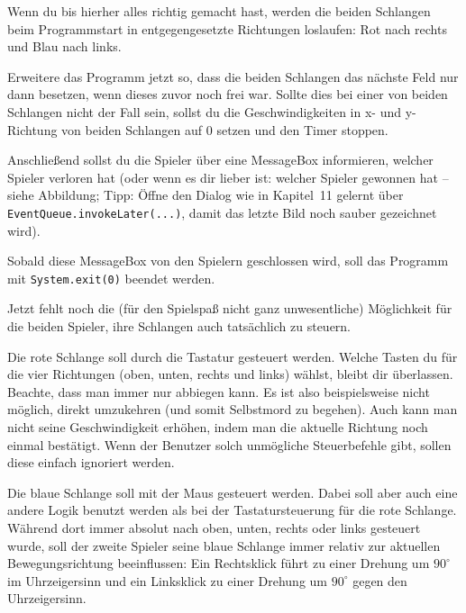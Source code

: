 \begin{compactenum}[a)]
\item Wenn du bis hierher alles richtig gemacht hast, werden die beiden
Schlangen beim Programmstart in entgegengesetzte Richtungen loslaufen: Rot
nach rechts und Blau nach links.

Erweitere das Programm jetzt so, dass die beiden Schlangen das nächste Feld nur
dann besetzen, wenn dieses zuvor noch frei war. Sollte dies bei einer von
beiden Schlangen nicht der Fall sein, sollst du die Geschwindigkeiten in x- und
y-Richtung von beiden Schlangen auf $0$ setzen und den Timer stoppen.

Anschließend sollst du die Spieler über eine MessageBox informieren, welcher
Spieler verloren hat (oder wenn es dir lieber ist: welcher Spieler gewonnen
hat -- siehe Abbildung; Tipp: Öffne den Dialog wie in Kapitel~11 gelernt über
\lstinline|EventQueue.invokeLater(...)|, damit das letzte Bild noch sauber
gezeichnet wird).

Sobald diese MessageBox von den Spielern geschlossen wird, soll das Programm
mit \lstinline|System.exit(0)| beendet werden.

\item Jetzt fehlt noch die (für den Spielspaß nicht ganz unwesentliche)
Möglichkeit für die beiden Spieler, ihre Schlangen auch tatsächlich zu steuern.

Die rote Schlange soll durch die Tastatur gesteuert werden. Welche Tasten du
für die vier Richtungen (oben, unten, rechts und links) wählst, bleibt dir
überlassen. Beachte, dass man immer nur abbiegen kann. Es ist also
beispielsweise nicht möglich, direkt umzukehren (und somit Selbstmord zu
begehen). Auch kann man nicht seine Geschwindigkeit erhöhen, indem man die
aktuelle Richtung noch einmal bestätigt. Wenn der Benutzer solch unmögliche
Steuerbefehle gibt, sollen diese einfach ignoriert werden.

\item Die blaue Schlange soll mit der Maus gesteuert werden. Dabei soll aber
auch eine andere Logik benutzt werden als bei der Tastatursteuerung für die
rote Schlange. Während dort immer absolut nach oben, unten, rechts oder links
gesteuert wurde, soll der zweite Spieler seine blaue Schlange immer relativ zur
aktuellen Bewegungsrichtung beeinflussen: Ein Rechtsklick führt zu einer
Drehung um $90^\circ$ im Uhrzeigersinn und ein Linksklick zu einer Drehung um
$90^\circ$ gegen den Uhrzeigersinn.
\end{compactenum}
